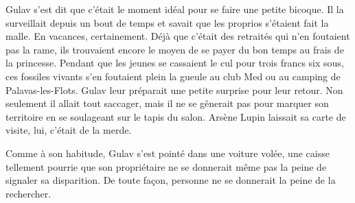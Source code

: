Gulav s’est dit que c’était le moment idéal pour se faire une petite bicoque. Il la surveillait depuis un bout de temps et savait que les proprios s’étaient fait la malle. En vacances, certainement. Déjà que c’était des retraités qui n’en foutaient pas la rame, ils trouvaient encore le moyen de se payer du bon temps au frais de la princesse. Pendant que les jeunes se cassaient le cul pour trois francs six sous, ces fossiles vivants s’en foutaient plein la gueule au club Med ou au camping de Palavas-les-Flots. Gulav leur préparait une petite surprise pour leur retour. Non seulement il allait tout saccager, mais il ne se gênerait pas pour marquer son territoire en se soulageant sur le tapis du salon. Arsène Lupin laissait sa carte de visite, lui, c’était de la merde.

Comme à son habitude, Gulav s’est pointé dans une voiture volée, une caisse tellement pourrie que son propriétaire ne se donnerait même pas la peine de signaler sa disparition. De toute façon, personne ne se donnerait la peine de la rechercher.

